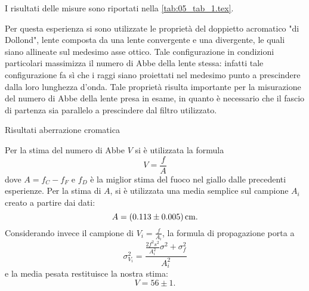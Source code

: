 I risultati delle misure sono riportati nella \autoref{tab:05_tab_1.tex}.

Per questa esperienza si sono utilizzate le propriet\`a del doppietto 
acromatico "di Dollond", lente composta da una lente convergente e una 
divergente, le quali siano allineate sul medesimo asse ottico. Tale 
configurazione in condizioni particolari massimizza 
il numero di Abbe della lente stessa: infatti 
tale configurazione fa s\`i che i raggi siano proiettati nel medesimo 
punto a prescindere dalla loro lunghezza d'onda. Tale propriet\`a risulta 
importante per la misurazione del numero di Abbe della lente presa in esame, 
in quanto \`e necessario che il fascio di partenza sia parallelo a 
prescindere dal filtro utilizzato.
\begin{tabella}
	\centering
	
	\caption{Risultati aberrazione cromatica}
	\label{tab:05_tab_1.tex}
\end{tabella}

Per la stima del numero di Abbe $V$ si \`e utilizzata la formula
\[ V=\frac{f}{A} \]
dove \(A= f_C - f_F\) e $f_D$ \`e la miglior stima del fuoco nel giallo dalle precedenti esperienze.
Per la stima di $A$, si \`e utilizzata una media semplice sul campione ${A_i}$ creato a partire dai dati:
\[ A = (0.113 \pm 0.005) \,\mathrm{cm} .\]
Considerando invece il campione di \( V_i=\frac{f}{A_i} \), la formula di propagazione porta a 
\[  \sigma^2_{V_i} = \frac{
\frac{2f^2   s^2}{A_i^2}   \sigma^2 +  \sigma^2_{f}
}{A_i^2} \]
e la media pesata restituisce la nostra stima:
\[V= 56 \pm 1 .\]
